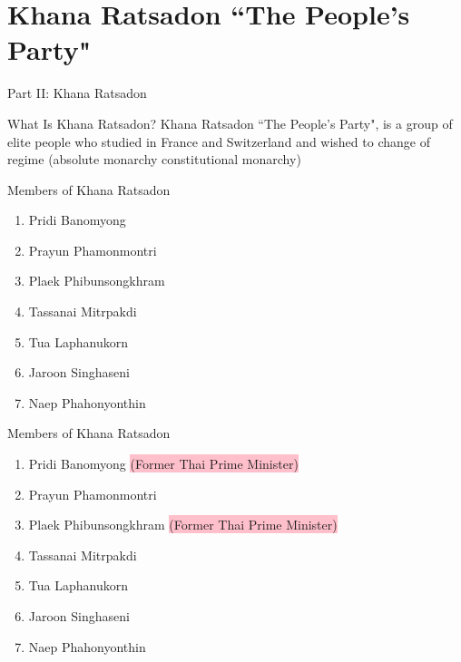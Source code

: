 \documentclass[aspectratio=169]{beamer}
\begin{document}
\section{Khana Ratsadon ``The People’s Party"}

\begin{frame}{Part II: Khana Ratsadon}
  \begin{block}{What Is Khana Ratsadon?}
   Khana Ratsadon ``The People’s Party", is a group of elite people who studied in France and Switzerland and wished to
change of regime (absolute monarchy \rightarrow{} constitutional monarchy)
  \end{block}
\end{frame}

\begin{frame}{Members of Khana Ratsadon}
	\begin{enumerate}
		\item Pridi Banomyong
		\item Prayun Phamonmontri
		\item Plaek Phibunsongkhram
		\item Tassanai Mitrpakdi
		\item Tua Laphanukorn
		\item Jaroon Singhaseni
		\item Naep Phahonyonthin
	\end{enumerate}
\end{frame}

\begin{frame}{Members of Khana Ratsadon}
	\begin{enumerate}
		\item Pridi Banomyong \colorbox{pink}{(Former Thai Prime Minister)}
		\item Prayun Phamonmontri
		\item Plaek Phibunsongkhram \colorbox{pink}{(Former Thai Prime Minister)}
		\item Tassanai Mitrpakdi
		\item Tua Laphanukorn
		\item Jaroon Singhaseni
		\item Naep Phahonyonthin
	\end{enumerate}
\end{frame}
\end{document}
